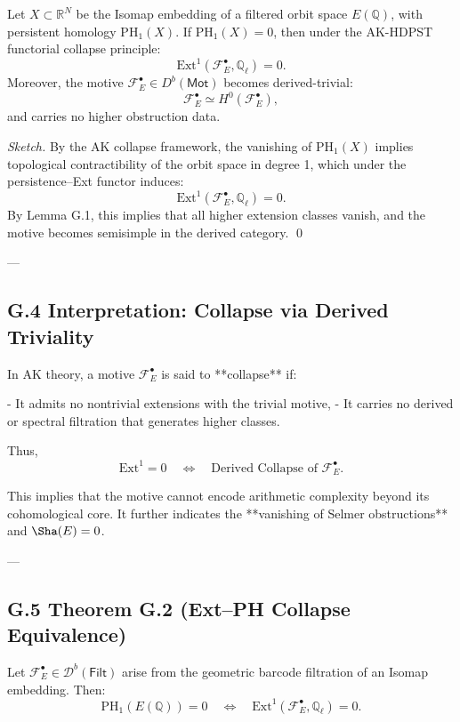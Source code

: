 \begin{theorem}
Let \( X \subset \mathbb{R}^N \) be the Isomap embedding of a filtered orbit space \( E(\mathbb{Q}) \), with persistent homology \( \mathrm{PH}_1(X) \).  
If \( \mathrm{PH}_1(X) = 0 \), then under the AK-HDPST functorial collapse principle:
\[
\mathrm{Ext}^1(\mathcal{F}_E^\bullet, \mathbb{Q}_\ell) = 0.
\]
Moreover, the motive \( \mathcal{F}_E^\bullet \in D^b(\mathsf{Mot}) \) becomes derived-trivial:
\[
\mathcal{F}_E^\bullet \simeq H^0(\mathcal{F}_E^\bullet),
\]
and carries no higher obstruction data.
\end{theorem}

\begin{proof}[Sketch]
By the AK collapse framework, the vanishing of \( \mathrm{PH}_1(X) \) implies topological contractibility of the orbit space in degree 1, which under the persistence–Ext functor induces:
\[
\mathrm{Ext}^1(\mathcal{F}_E^\bullet, \mathbb{Q}_\ell) = 0.
\]
By Lemma G.1, this implies that all higher extension classes vanish, and the motive becomes semisimple in the derived category.
\qed
\end{proof}


---

\subsection*{G.4 Interpretation: Collapse via Derived Triviality}

In AK theory, a motive \( \mathcal{F}_E^\bullet \) is said to **collapse** if:

- It admits no nontrivial extensions with the trivial motive,
- It carries no derived or spectral filtration that generates higher classes.

Thus,
\[
\mathrm{Ext}^1 = 0 \quad \Longleftrightarrow \quad \text{Derived Collapse of } \mathcal{F}_E^\bullet.
\]

This implies that the motive cannot encode arithmetic complexity beyond its cohomological core.  
It further indicates the **vanishing of Selmer obstructions** and \( \Sha(E) = 0 \).

---

\subsection*{G.5 Theorem G.2 (Ext–PH Collapse Equivalence)}

\begin{theorem}
Let \( \mathcal{F}_E^\bullet \in \mathcal{D}^b(\mathsf{Filt}) \) arise from the geometric barcode filtration of an Isomap embedding. Then:
\[
\mathrm{PH}_1(E(\mathbb{Q})) = 0 \quad \Longleftrightarrow \quad \mathrm{Ext}^1(\mathcal{F}_E^\bullet, \mathbb{Q}_\ell) = 0.
\]
\end{theorem}

